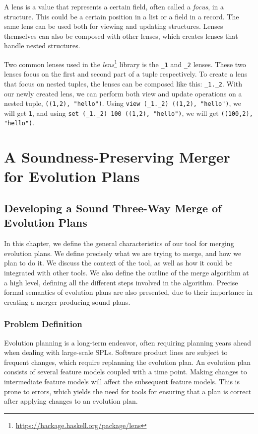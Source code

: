 \documentclass[a4paper,english]{ifimaster}
\begin{document}
A lens is a value that represents a certain field, often called a \textit{focus}, in a structure. This could be a certain position in a list or a field in a record. The same lens can be used both for viewing and updating structures. Lenses themselves can also be composed with other lenses, which creates lenses that handle nested structures.

Two common lenses used in the \textit{lens}\footnote{\url{https://hackage.haskell.org/package/lens}} library is the \texttt{\_1} and \texttt{\_2} lenses. These two lenses focus on the first and second part of a tuple respectively. To create a lens that focus on nested tuples, the lenses can be composed like this: \texttt{\_1.\_2}. With our newly created lens, we can perform both view and update operations on a nested tuple, \texttt{((1,2), "hello")}. Using \texttt{view (\_1.\_2) ((1,2), "hello")}, we will get \texttt{1}, and using \texttt{set (\_1.\_2) 100 ((1,2), "hello")}, we will get \texttt{((100,2), "hello")}.

\part{A Soundness-Preserving Merger for Evolution Plans}%
\label{prt:a_sound_semantic_merger_for_evolution_plans}

\chapter{Developing a Sound Three-Way Merge of Evolution Plans}%
\label{cha:developing_a_sound_three_way_merge_of_evolution_plans}

In this chapter, we define the general characteristics of our tool for merging evolution plans. We define precisely what we are trying to merge, and how we plan to do it. We discuss the context of the tool, as well as how it could be integrated with other tools. We also define the outline of the merge algorithm at a high level, defining all the different steps involved in the algorithm. Precise formal semantics of evolution plans are also presented, due to their importance in creating a merger producing sound plans.

\section{Problem Definition}%
\label{sec:problem_defintion}

Evolution planning is a long-term endeavor, often requiring planning years ahead when dealing with large-scale SPLs. Software product lines are subject to frequent changes, which require replanning the evolution plan. An evolution plan consists of several feature models coupled with a time point. Making changes to intermediate feature models will affect the subsequent feature models. This is prone to errors, which yields the need for tools for ensuring that a plan is correct after applying changes to an evolution plan.
\end{document}
